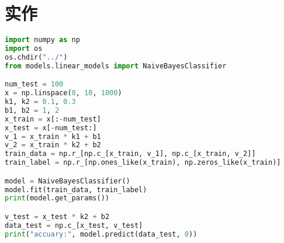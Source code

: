 \documentclass{report}
\begin{document}
\section{实作}
\begin{lstlisting}[language={python}]
import numpy as np
import os
os.chdir("../")
from models.linear_models import NaiveBayesClassifier

num_test = 100
x = np.linspace(0, 10, 1000)
k1, k2 = 0.1, 0.3
b1, b2 = 1, 2
x_train = x[:-num_test]
x_test = x[-num_test:]
v_1 = x_train * k1 + b1
v_2 = x_train * k2 + b2
train_data = np.r_[np.c_[x_train, v_1], np.c_[x_train, v_2]]
train_label = np.r_[np.ones_like(x_train), np.zeros_like(x_train)]

model = NaiveBayesClassifier()
model.fit(train_data, train_label)
print(model.get_params())

v_test = x_test * k2 + b2
data_test = np.c_[x_test, v_test]
print("accuary:", model.predict(data_test, 0))
\end{lstlisting}
\end{document}
